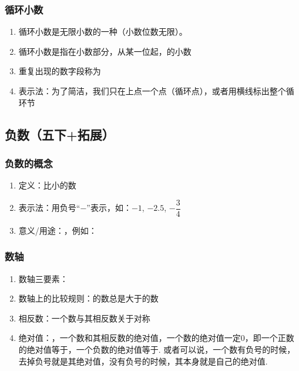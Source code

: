 \subsubsection*{循环小数}
\begin{enumerate}
    \item 循环小数是无限小数的一种（小数位数无限）。
    \item 循环小数是指在小数部分，从某一位起，的小数
    \item 重复出现的数字段称为
    \item 表示法：为了简洁，我们只在上点一个点（循环点），或者用横线标出整个循环节
\end{enumerate}

\subsection*{负数（五下+拓展）}
\subsubsection*{负数的概念}
\begin{enumerate}
    \item 定义：比小的数
    \item 表示法：用负号“$-$”表示，如：$-1$, $-2.5$, $-\dfrac{3}{4}$
    \item 意义/用途：，例如：
\end{enumerate}
\subsubsection*{数轴}
\begin{enumerate}
    \item 数轴三要素：
    \item 数轴上的比较规则：的数总是大于的数
    \item 相反数：一个数与其相反数关于对称
    \item 绝对值：，一个数和其相反数的绝对值，一个数的绝对值一定0，即一个正数的绝对值等于，一个负数的绝对值等于. 或者可以说，一个数有负号的时候，去掉负号就是其绝对值，没有负号的时候，其本身就是自己的绝对值.
\end{enumerate}
